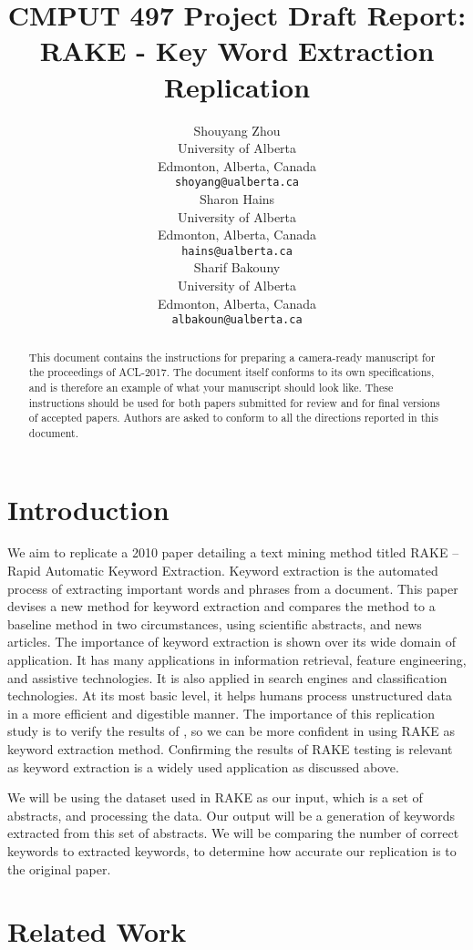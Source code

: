 \documentclass[11pt,a4paper]{article}
\title{CMPUT 497 Project Draft Report: \\ RAKE - Key Word Extraction Replication}
\author{Shouyang Zhou \\
  University of Alberta \\
  Edmonton, Alberta, Canada \\
  {\tt shoyang@ualberta.ca} \\\And
  Sharon Hains \\
  University of Alberta \\
  Edmonton, Alberta, Canada \\
  {\tt hains@ualberta.ca} \\\And
  Sharif Bakouny \\
  University of Alberta \\
  Edmonton, Alberta, Canada \\
  {\tt albakoun@ualberta.ca} \\}
\date{}
\begin{document}
\maketitle
\begin{abstract}
  This document contains the instructions for preparing a camera-ready
  manuscript for the proceedings of ACL-2017. The document itself
  conforms to its own specifications, and is therefore an example of
  what your manuscript should look like. These instructions should be
  used for both papers submitted for review and for final versions of
  accepted papers.  Authors are asked to conform to all the directions
  reported in this document.
\end{abstract}

\section{Introduction}

We aim to replicate a 2010 paper detailing a text mining method titled RAKE – Rapid Automatic Keyword Extraction. Keyword extraction is the automated process of extracting important words and phrases from a document. This paper devises a new method for keyword extraction and compares the method to a baseline method in two circumstances, using scientific abstracts, and news articles. The importance of keyword extraction is shown over its wide domain of application. It has many applications in information retrieval, feature engineering, and assistive technologies.  It is also applied in search engines and classification technologies. At its most basic level, it helps humans process unstructured data in a more efficient and digestible manner. The importance of this replication study is to verify the results of \citet{1}, so we can be more confident in using RAKE as keyword extraction method. Confirming the results of RAKE testing is relevant as keyword extraction is a widely used application as discussed above. 

We will be using the dataset used in RAKE as our input, which is a set of abstracts, and processing the data. Our output will be a generation of keywords extracted from this set of abstracts. We will be comparing the number of correct keywords to extracted keywords, to determine how accurate our replication is to the original paper. 

\section{Related Work}
\end{document}
